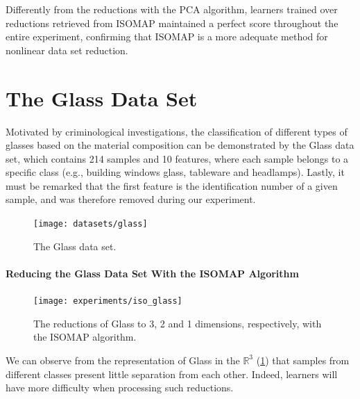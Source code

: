Differently from the reductions with the PCA algorithm, learners trained over reductions retrieved from ISOMAP maintained a perfect score throughout the entire experiment, confirming that ISOMAP is a more adequate method for nonlinear data set reduction.

\clearpage
\section{The Glass Data Set}

Motivated by criminological investigations, the classification of different types of glasses based on the material composition can be demonstrated by the Glass data set, which contains 214 samples and 10 features, where each sample belongs to a specific class (e.g., building windows glass, tableware and headlamps). Lastly, it must be remarked that the first feature is the identification number of a given sample, and was therefore removed during our experiment.
\newline\newline

\begin{figure}[H]
	\centering
	\texttt{[image: datasets/glass]}
	\captionsetup{justification=centering}
	\caption{The Glass data set.}
\end{figure}

\newpage
\paragraph{Reducing the Glass Data Set With the ISOMAP Algorithm}

\begin{figure}[H]
	\centering
	\captionsetup{justification=centering}
	\texttt{[image: experiments/iso\_glass]}
	\caption{The reductions of Glass to 3, 2 and 1 dimensions, respectively, with the ISOMAP algorithm.}
	\label{fig:dsglassiso}
\end{figure}

We can observe from the representation of Glass in the $\mathbb{R}^3$ (\ref{fig:dsglassiso}) that samples from different classes present little separation from each other. Indeed, learners will have more difficulty when processing such reductions.

